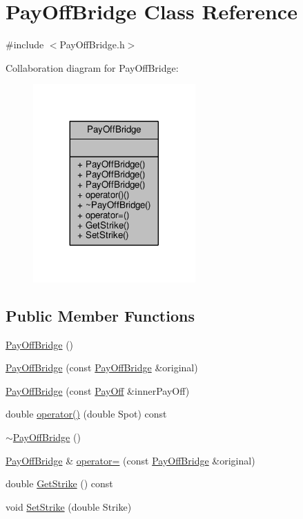 \hypertarget{classPayOffBridge}{}\section{Pay\+Off\+Bridge Class Reference}
\label{classPayOffBridge}


{\ttfamily \#include $<$Pay\+Off\+Bridge.\+h$>$}



Collaboration diagram for Pay\+Off\+Bridge\+:
\nopagebreak
\begin{figure}[H]
\begin{center}
\leavevmode
\includegraphics[width=176pt]{classPayOffBridge__coll__graph}
\end{center}
\end{figure}
\subsection*{Public Member Functions}
\begin{DoxyCompactItemize}
\item 
\hyperlink{classPayOffBridge_a77f6f247c82e50276f36050cec6411c0}{Pay\+Off\+Bridge} ()
\item 
\hyperlink{classPayOffBridge_ad727d80f5c03d94b07c8b795ed71414b}{Pay\+Off\+Bridge} (const \hyperlink{classPayOffBridge}{Pay\+Off\+Bridge} \&original)
\item 
\hyperlink{classPayOffBridge_a6a8fcd595a1c2ac037084fa5b42f40d7}{Pay\+Off\+Bridge} (const \hyperlink{classPayOff}{Pay\+Off} \&inner\+Pay\+Off)
\item 
double \hyperlink{classPayOffBridge_a1c8822e8905a5dc685c291efd9fd50f3}{operator()} (double Spot) const
\item 
\hyperlink{classPayOffBridge_adce15b3a19db6f77856f9d755cc8e549}{$\sim$\+Pay\+Off\+Bridge} ()
\item 
\hyperlink{classPayOffBridge}{Pay\+Off\+Bridge} \& \hyperlink{classPayOffBridge_a385d8efcf0fe071fd5718c010321c4f1}{operator=} (const \hyperlink{classPayOffBridge}{Pay\+Off\+Bridge} \&original)
\item 
double \hyperlink{classPayOffBridge_aa37a5dedbef7fdc968255504a77c33e3}{Get\+Strike} () const
\item 
void \hyperlink{classPayOffBridge_a7e2924916dd98511d8ec0549a80201b4}{Set\+Strike} (double Strike)
\end{DoxyCompactItemize}


